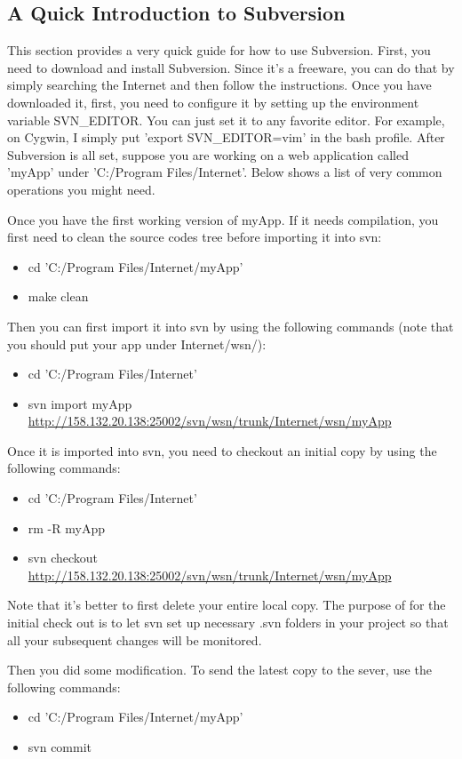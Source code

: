 \subsection{A Quick Introduction to Subversion}
\label{sec:svn}
This section provides a very quick guide for how to use Subversion. First, you need to download and install Subversion. Since it's a freeware, you can do that by simply searching the Internet and then follow the instructions. Once you have downloaded it, first, you need to configure it by setting up the environment variable SVN\_EDITOR. You can just set it to any favorite editor. For example, on Cygwin, I simply put 'export SVN\_EDITOR=vim' in the bash profile. After Subversion is all set, suppose you are working on a web application called 'myApp' under 'C:/Program Files/Internet'. Below shows a list of very common operations you might need.

Once you have the first working version of myApp. If it needs compilation, you first need to clean the source codes tree before importing it into svn:
\begin{itemize}
\item cd 'C:/Program Files/Internet/myApp'
\item make clean
\end{itemize}

Then you can first import it into svn by using the following commands (note that you should put your app under Internet/wsn/):
\begin{itemize}
\item cd 'C:/Program Files/Internet'
\item svn import myApp \url{http://158.132.20.138:25002/svn/wsn/trunk/Internet/wsn/myApp}
\end{itemize}

Once it is imported into svn, you need to checkout an initial copy by using the following commands:
\begin{itemize}
\item cd 'C:/Program Files/Internet'
\item rm -R myApp
\item svn checkout \url{http://158.132.20.138:25002/svn/wsn/trunk/Internet/wsn/myApp}
\end{itemize}
Note that it's better to first delete your entire local copy. The purpose of for the initial check out is to let svn set up necessary .svn folders in your project so that all your subsequent changes will be monitored.

Then you did some modification. To send the latest copy to the sever, use the following commands:
\begin{itemize}
\item cd 'C:/Program Files/Internet/myApp'
\item svn commit
\end{itemize}

